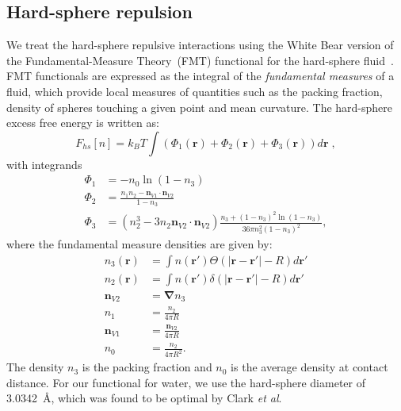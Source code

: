 \documentclass[twocolumn,amsmath,amssymb,prb]{revtex4-1}
\newcommand{\xx}{\textbf{r}}
\begin{document}
\subsection{Hard-sphere repulsion}

We treat the hard-sphere repulsive interactions using the White Bear version of
the Fundamental-Measure Theory~(FMT) functional for the hard-sphere
fluid~\cite{roth2002whitebear, yu2002structures}.  FMT functionals are expressed as the integral of
the \emph{fundamental measures} of a fluid, which provide local
measures of quantities such as the packing fraction, density of
spheres touching a given point and mean curvature.  The hard-sphere
excess free energy is written as:
\begin{equation}
F_{hs}[n] = k_B T \int (\Phi_1(\xx) + \Phi_2(\xx) + \Phi_3(\xx)) d\xx \; ,
\end{equation}
with integrands
\begin{align}
\Phi_1 &= -n_0 \ln\left( 1 - n_3\right)\\
\Phi_2 &= \frac{n_1 n_2 - \mathbf{n}_{V1} \cdot\mathbf{n}_{V2}}{1-n_3} \\
\Phi_3 &= (n_2^3 - 3n_2 \mathbf{n}_{V2} \cdot \mathbf{n}_{V2})
  \frac{
    n_3 + (1-n_3)^2\ln(1-n_3)
  }{
    36\pi n_3^2\left( 1 - n_3 \right)^2
  } ,
\end{align}
where the fundamental measure densities are given by:
\begin{align}
  n_3(\xx) &= \int n(\xx') \Theta(\left|\xx - \xx'\right| - R) d\xx' \\
  n_2(\xx) &= \int n(\xx') \delta(\left|\xx - \xx'\right| - R) d\xx'
  \\
  \mathbf{n}_{V2} &= \mathbf{\nabla} n_3 \\
  n_1 &= \frac{n_2}{4\pi R}\\
  \mathbf{n}_{V1} &= \frac{\mathbf{n}_{V2}}{4\pi R}\\
  n_0 &= \frac{n_2}{4\pi R^2}.
\end{align}
The density $n_3$ is the packing fraction and $n_0$ is the
average density at contact distance. For our functional for water, we
use the hard-sphere diameter of 3.0342~\AA, which was found to be
optimal by Clark \emph{et al}.\cite{clark2006developing}

\newcommand\etadisp{\ensuremath{\eta_\textit{d}}}
\newcommand\epsilondisp{\ensuremath{\epsilon_\textit{d}}}
\newcommand\epsilonassoc{\ensuremath{\epsilon_\textit{a}}}
\newcommand\kappaassoc{\ensuremath{\kappa_\textit{a}}}
\newcommand\lambdadisp{\ensuremath{\lambda_\textit{d}}}
\newcommand\lscale{\ensuremath{s_d}}
\end{document}
